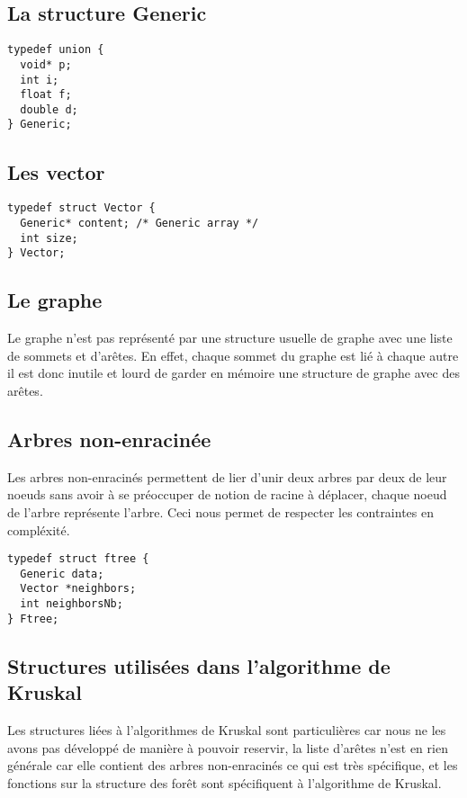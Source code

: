 \documentclass[a4paper]{article}
\begin{document}
\subsection{La structure Generic}

\begin{verbatim}
typedef union {
  void* p;
  int i;
  float f;
  double d;
} Generic;
\end{verbatim}

\subsection{Les vector}

\begin{verbatim}
typedef struct Vector {
  Generic* content; /* Generic array */
  int size;
} Vector;
\end{verbatim}

\subsection{Le graphe}

Le graphe n'est pas représenté par une structure usuelle de graphe avec une liste de sommets et d'arêtes. En effet, chaque sommet du graphe est lié à chaque autre il est donc inutile et lourd de garder en mémoire une structure de graphe avec des arêtes.

\subsection{Arbres non-enracinée}

Les arbres non-enracinés permettent de lier d'unir deux arbres par deux de leur noeuds sans avoir à se préoccuper de notion de racine à déplacer, chaque noeud de l'arbre représente l'arbre. Ceci nous permet de respecter les contraintes en compléxité. 

\begin{verbatim}
typedef struct ftree {
  Generic data;
  Vector *neighbors;
  int neighborsNb;
} Ftree;
\end{verbatim}

\subsection{Structures utilisées dans l'algorithme de Kruskal}

Les structures liées à l'algorithmes de Kruskal sont particulières car nous ne les avons pas développé de manière à pouvoir reservir, la liste d'arêtes n'est en rien générale car elle contient des arbres non-enracinés ce qui est très spécifique, et les fonctions sur la structure des forêt sont spécifiquent à l'algorithme de Kruskal.
\end{document}
